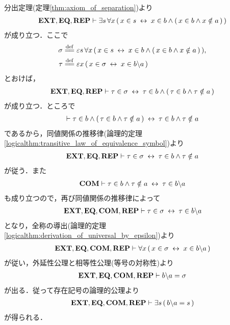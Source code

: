 	\begin{sketch}
		分出定理(定理\ref{thm:axiom_of_separation})より
		\begin{align}
			\mbox{{\bf EXT}},\mbox{{\bf EQ}},\mbox{{\bf REP}} \vdash \exists s\, \forall x\, (\, x \in s \hspace{0.25em}\leftrightarrow\hspace{0.25em} x \in b \wedge (\, x \in b \wedge x \notin a\, )\, )
		\end{align}
		が成り立つ．ここで
		\begin{align}
			\sigma &\defeq \varepsilon s\, \forall x\, (\, x \in s \lrarrow x \in b \wedge (\, x \in b \wedge x \notin a\, )\, ), \\
			\tau &\defeq \varepsilon x\, (\, x \in \sigma \lrarrow x \in b \backslash a\, )
		\end{align}
		とおけば，
		\begin{align}
			\mbox{{\bf EXT}},\mbox{{\bf EQ}},\mbox{{\bf REP}} \vdash \tau \in \sigma \hspace{0.25em}\leftrightarrow\hspace{0.25em} \tau \in b \wedge (\, \tau \in b \wedge \tau \notin a\, )
		\end{align}
		が成り立つ．ところで
		\begin{align}
			\vdash \tau \in b \wedge (\, \tau \in b \wedge \tau \notin a\, ) \hspace{0.25em}\leftrightarrow\hspace{0.25em} \tau \in b \wedge \tau \notin a
		\end{align}
		であるから，同値関係の推移律(論理的定理\ref{logicalthm:transitive_law_of_equivalence_symbol})より
		\begin{align}
			\mbox{{\bf EXT}},\mbox{{\bf EQ}},\mbox{{\bf REP}} \vdash \tau \in \sigma \hspace{0.25em}\leftrightarrow\hspace{0.25em} \tau \in b \wedge \tau \notin a
		\end{align}
		が従う．また
		\begin{align}
			\mbox{\bf COM} \vdash \tau \in b \wedge \tau \notin a \hspace{0.25em}\leftrightarrow\hspace{0.25em} \tau \in b \backslash a
		\end{align}
		も成り立つので，再び同値関係の推移律によって
		\begin{align}
			\mbox{{\bf EXT}},\mbox{{\bf EQ}},\mbox{\bf COM},\mbox{{\bf REP}} \vdash \tau \in \sigma \hspace{0.25em}\leftrightarrow\hspace{0.25em} \tau \in b \backslash a
		\end{align}
		となり，全称の導出(論理的定理\ref{logicalthm:derivation_of_universal_by_epsilon})より
		\begin{align}
			\mbox{{\bf EXT}},\mbox{{\bf EQ}},\mbox{\bf COM},\mbox{{\bf REP}} \vdash \forall x\, (\, x \in \sigma \hspace{0.25em}\leftrightarrow\hspace{0.25em} x \in b \backslash a\, )
		\end{align}
		が従い，外延性公理と相等性公理(等号の対称性)より
		\begin{align}
			\mbox{{\bf EXT}},\mbox{{\bf EQ}},\mbox{\bf COM},\mbox{{\bf REP}} \vdash b \backslash a = \sigma
		\end{align}
		が出る．従って存在記号の論理的公理より
		\begin{align}
			\mbox{{\bf EXT}},\mbox{{\bf EQ}},\mbox{\bf COM},\mbox{{\bf REP}} \vdash \exists s\, (\, b \backslash a = s\, )
		\end{align}
		が得られる．
		\QED
	\end{sketch}
	
